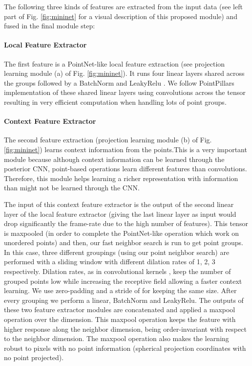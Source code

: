 \documentclass[letterpaper, 10 pt, journal, twoside]{IEEEtran}
\begin{document}
The following three kinds of features are extracted from the input data 
(see left part of Fig. \ref{fig:mininet} for a visual description of this proposed module) and fused in the final module step:

 
\paragraph*{Local Feature Extractor}
The first feature is a PointNet-like local feature extraction (see projection learning module (a) of Fig. \ref{fig:mininet}). It runs four linear layers shared across the groups followed by a BatchNorm \cite{ioffe2015batch} and LeakyRelu \cite{maas2013rectifier}. We follow PointPillars \cite{lang2019pointpillars} implementation of these shared linear layers using  convolutions across the tensor resulting in very efficient computation when handling lots of point groups.  


\paragraph*{Context Feature Extractor}
The second feature extraction (projection learning module (b) of Fig. \ref{fig:mininet}) learns context information from the points.This is a very important module because although  context information can be learned through the posterior CNN, point-based operations learn different features than convolutions.  Therefore, this module helps learning a richer representation with information than might not be learned through the CNN.

The input of this context feature extractor is the output of the second linear layer of the local feature extractor (giving the last linear layer as input would drop significantly the frame-rate due to the high number of features). This tensor is maxpooled (in order to complete the PointNet-like operation which work on unordered points) and then, our fast neighbor search is run to get point groups. In this case, three different groupings (using our point neighbor search) are performed with a  sliding window with different dilation rates of  1, 2, 3 respectively. Dilation rates, as in convolutional kernels \cite{YuKoltun2016}, keep the number of grouped points low while increasing the receptive field allowing a faster context learning. We use zero-padding and a stride of  for keeping the same size. 
After every grouping we perform a linear, BatchNorm and LeakyRelu.  
The outputs of these two feature extractor modules are concatenated and applied a maxpool operation over the  dimension.  This maxpool operation keeps the feature with higher response along the neighbor dimension, being order-invariant with respect to the neighbor dimension. The maxpool operation also makes the learning robust to pixels with no point information (spherical projection coordinates with no point projected).
\end{document}
